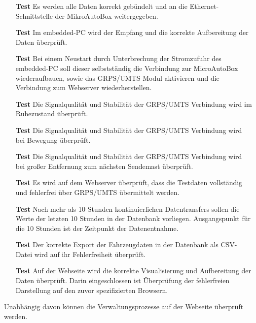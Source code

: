 \documentclass[fontsize = 12pt, paper = a4]{scrreprt}
\begin{document}
\begin{itemize}
\item[\textbf{Test}] Es werden alle Daten korrekt gebündelt und an die Ethernet-Schnittstelle der MikroAutoBox weitergegeben. 
\item[\textbf{Test}] Im embedded-PC wird der Empfang und die korrekte Aufbereitung der Daten überprüft.
\item[\textbf{Test}] Bei einem Neustart durch Unterbrechung der Stromzufuhr des embedded-PC soll dieser selbstständig die Verbindung zur MicroAutoBox wiederaufbauen, sowie das GRPS/UMTS Modul aktivieren und die Verbindung zum Webserver wiederherstellen.
\item[\textbf{Test}] Die Signalqualität und Stabilität der GRPS/UMTS Verbindung wird im Ruhezustand überprüft.
\item[\textbf{Test}] Die Signalqualität und Stabilität der GRPS/UMTS Verbindung wird bei Bewegung überprüft.
\item[\textbf{Test}] Die Signalqualität und Stabilität der GRPS/UMTS Verbindung wird bei großer Entfernung zum nächsten Sendemast überprüft.
\item[\textbf{Test}] Es wird auf dem Webserver überprüft, dass die Testdaten vollständig und fehlerfrei über GRPS/UMTS übermittelt werden.
\item[\textbf{Test}] Nach mehr als 10 Stunden kontinuierlichen Datentransfers sollen die Werte der letzten 10 Stunden in der Datenbank vorliegen. Ausgangspunkt für die 10 Stunden ist der Zeitpunkt der Datenentnahme.
\item[\textbf{Test}] Der korrekte Export der Fahrzeugdaten in der Datenbank als CSV-Datei wird auf ihr Fehlerfreiheit überprüft.
\item[\textbf{Test}] Auf der Webseite wird die korrekte Visualisierung und Aufbereitung der Daten überprüft. Darin eingeschlossen ist Überprüfung der fehlerfreien Darstellung auf den zuvor spezifizierten Browsern. 
\end{itemize}

Unabhängig davon können die Verwaltungsprozesse auf der Webseite überprüft werden.
\end{document}
